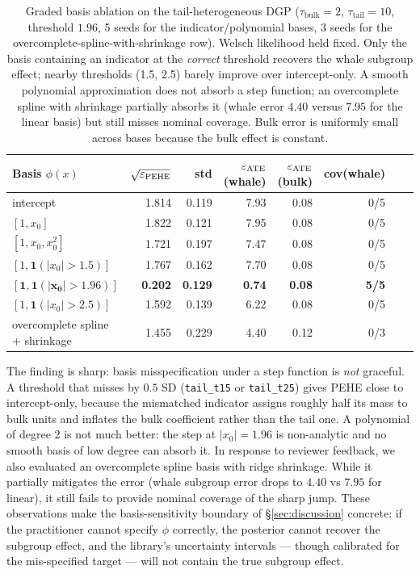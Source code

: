 \begin{table}[!t]
\centering
\small
\begin{tabular}{lrrrrrrr}
\toprule
Basis $\phi(x)$ & $\sqrt{\varepsilon_{\mathrm{PEHE}}}$ & std & $\varepsilon_{\mathrm{ATE}}$(whale) & $\varepsilon_{\mathrm{ATE}}$(bulk) & cov(whale) \\
\midrule
intercept                       & 1.814 & 0.119 & 7.93 & 0.08 & 0/5 \\
$[1, x_0]$                      & 1.822 & 0.121 & 7.95 & 0.08 & 0/5 \\
$[1, x_0, x_0^2]$                  & 1.721 & 0.197 & 7.47 & 0.08 & 0/5 \\
$[1, \mathbf{1}(|x_0|>1.5)]$    & 1.767 & 0.162 & 7.70 & 0.08 & 0/5 \\
$\mathbf{[1, \mathbf{1}(|x_0|>1.96)]}$ & \textbf{0.202} & \textbf{0.129} & \textbf{0.74} & \textbf{0.08} & \textbf{5/5} \\
$[1, \mathbf{1}(|x_0|>2.5)]$    & 1.592 & 0.139 & 6.22 & 0.08 & 0/5 \\
overcomplete spline + shrinkage & 1.455 & 0.229 & 4.40 & 0.12 & 0/3 \\
\bottomrule
\end{tabular}
\caption{Graded basis ablation on the tail-heterogeneous DGP
($\tau_{\text{bulk}} = 2$, $\tau_{\text{tail}} = 10$, threshold
$1.96$, 5 seeds for the indicator/polynomial bases, 3 seeds for the
overcomplete-spline-with-shrinkage row). Welsch likelihood held
fixed. Only the basis containing an indicator at the \emph{correct}
threshold recovers the whale subgroup effect; nearby thresholds
(1.5, 2.5) barely improve over intercept-only. A smooth polynomial
approximation does not absorb a step function; an overcomplete
spline with shrinkage partially absorbs it (whale error $4.40$
versus $7.95$ for the linear basis) but still misses nominal
coverage. Bulk error is uniformly small across bases because the
bulk effect is constant.}
\label{tab:basis_ablation}
\end{table}

The finding is sharp: basis misspecification under a step function
is \emph{not} graceful. A threshold that misses by $0.5$ SD
(\texttt{tail\_t15} or \texttt{tail\_t25}) gives PEHE close to
intercept-only, because the mismatched indicator assigns roughly
half its mass to bulk units and inflates the bulk coefficient rather
than the tail one. A polynomial of degree 2 is not much better: the
step at $|x_0| = 1.96$ is non-analytic and no smooth basis of low
degree can absorb it. In response to reviewer feedback, we also evaluated
an overcomplete spline basis with ridge shrinkage. While it partially
mitigates the error (whale subgroup error drops to $4.40$ vs $7.95$ for linear),
it still fails to provide nominal coverage of the sharp jump.
These observations make the basis-sensitivity
boundary of \S\ref{sec:discussion} concrete: if the
practitioner cannot specify $\phi$ correctly, the posterior cannot
recover the subgroup effect, and the library's uncertainty
intervals --- though calibrated for the mis-specified target ---
will not contain the true subgroup effect.


